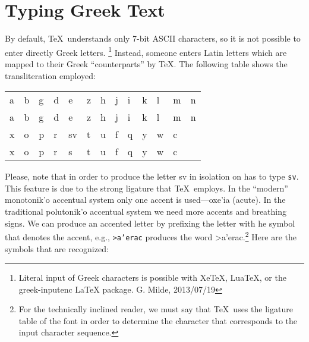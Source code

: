 \documentclass[11pt]{article}
\newcommand{\sg}{\selectlanguage{greek}}
\newcommand{\sa}{\selectlanguage{american}}
\begin{document}
\section{Typing Greek Text}
By default, \TeX\ understands only 7-bit ASCII characters, so it is not
possible to enter directly Greek letters.%
\footnote{Literal input of Greek characters
is possible with XeTeX, LuaTeX, or the greek-inputenc LaTeX package.
G. Milde, 2013/07/19}
Instead, someone enters Latin letters
which are mapped to their Greek ``counterparts'' by \TeX. The following
table shows the transliteration employed:
\begin{center}
\begin{tabular}{|lllllllllllll|}\hline
\textgreek{a}&  
\textgreek{b}&   
\textgreek{g}&  
\textgreek{d}&  
\textgreek{e}&  
\textgreek{z}&  
\textgreek{h}&  
\textgreek{j}&   
\textgreek{i}&   
\textgreek{k}&   
\textgreek{l}&   
\textgreek{m}&
\textgreek{n}\\
a& b& g& d&  e&  z&  h&  j&  i&  k&  l&  m&  n\\
\hline    
\textgreek{x}&  
\textgreek{o}&  
\textgreek{p}&  
\textgreek{r}&  
\textgreek{sv}&  
\textgreek{t}&  
\textgreek{u}&  
\textgreek{f}&  
\textgreek{q}&  
\textgreek{y}&  
\textgreek{w}& 
\textgreek{c}& \hbox{ } \\
x&  o&  p&  r&  s&   
t&  u&  f&  q&  y&  w& c& \hbox{ }\\ \hline
\end{tabular}
\end{center}
Please, note that in order to produce the letter \textgreek{sv} in isolation
on has to type \texttt{sv}. This feature is due to the strong ligature
that \TeX\ employs. 
In the ``modern'' \textgreek{monotonik'o} accentual system only one accent is 
used---\textgreek{oxe'ia} (acute). In the traditional \textgreek{polutonik'o} 
accentual system we 
need more accents and breathing signs. We can produce an accented letter by
prefixing the letter with he symbol that denotes the accent, e.g.,
\texttt{>a'erac} produces the word \sg >a'erac.\sa\footnote{For the 
technically inclined reader, we must say that \TeX\ uses the ligature table of
the font in order to determine the character that corresponds to the
input character sequence.} Here are the symbols that are recognized: 
\end{document}
